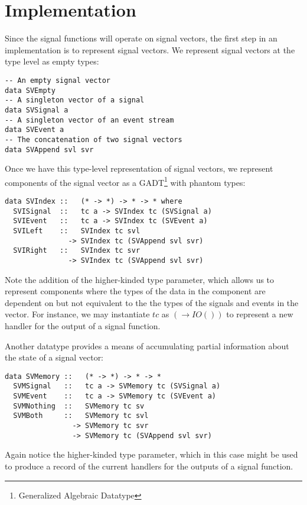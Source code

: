 \section{Implementation}
\label{section:implementation}

Since the signal functions will operate on signal vectors, the first step in an implementation is to represent signal vectors.
We represent signal vectors at the type level as empty types:

\begin{verbatim}
-- An empty signal vector
data SVEmpty
-- A singleton vector of a signal
data SVSignal a
-- A singleton vector of an event stream
data SVEvent a
-- The concatenation of two signal vectors
data SVAppend svl svr 
\end{verbatim}

Once we have this type-level representation of signal vectors, we represent components of the signal vector as a GADT\footnote{Generalized Algebraic Datatype}
with phantom types:

\begin{verbatim}
data SVIndex ::   (* -> *) -> * -> * where
  SVISignal  ::   tc a -> SVIndex tc (SVSignal a)
  SVIEvent   ::   tc a -> SVIndex tc (SVEvent a)
  SVILeft    ::   SVIndex tc svl 
               -> SVIndex tc (SVAppend svl svr)
  SVIRight   ::   SVIndex tc svr 
               -> SVIndex tc (SVAppend svl svr)
\end{verbatim}

Note the addition of the higher-kinded type parameter, which allows us to represent components where the types of the data
in the component are dependent on but not equivalent to the the types of the signals and events in the vector. For instance,
we may instantiate $tc$ as $(\rightarrow IO ())$ to represent a new handler for the output of a signal function.

Another datatype provides a means of accumulating partial information about the state of a signal vector:
\begin{verbatim}
data SVMemory ::   (* -> *) -> * -> *
  SVMSignal   ::   tc a -> SVMemory tc (SVSignal a)
  SVMEvent    ::   tc a -> SVMemory tc (SVEvent a)
  SVMNothing  ::   SVMemory tc sv
  SVMBoth     ::   SVMemory tc svl
                -> SVMemory tc svr 
                -> SVMemory tc (SVAppend svl svr)
\end{verbatim}

Again notice the higher-kinded type parameter, which in this case might be used to produce a record of the current
handlers for the outputs of a signal function. 

